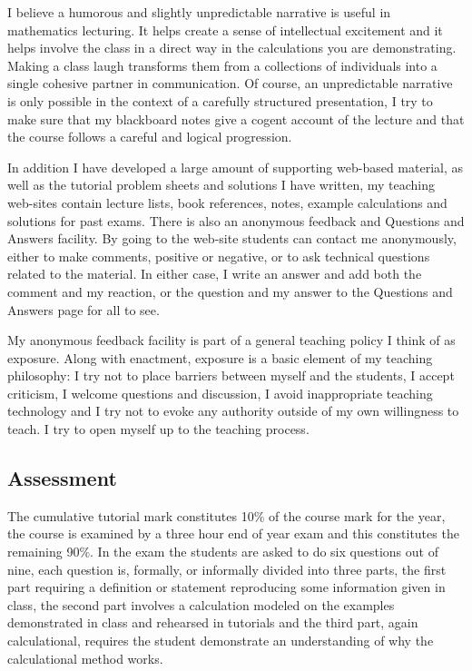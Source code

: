 \documentclass[12pt,a4wide]{article}
\begin{document}
I believe a humorous and slightly unpredictable narrative is useful in
mathematics lecturing. It helps create a sense of intellectual
excitement and it helps involve the class in a direct way in the
calculations you are demonstrating. Making a class laugh transforms
them from a collections of individuals into a single cohesive partner
in communication. Of course, an unpredictable narrative is only
possible in the context of a carefully structured presentation, I try
to make sure that my blackboard notes give a cogent account of the
lecture and that the course follows a careful and logical progression.

In addition I have developed a large amount of supporting web-based
material, as well as the tutorial problem sheets and solutions I have
written, my teaching web-sites contain lecture lists, book references,
notes, example calculations and solutions for past exams.  There is
also an anonymous feedback and Questions and Answers facility. By
going to the web-site students can contact me anonymously, either to
make comments, positive or negative, or to ask technical questions
related to the material. In either case, I write an answer and add
both the comment and my reaction, or the question and my answer to the
Questions and Answers page for all to see.

My anonymous feedback facility is part of a general teaching policy I
think of as exposure.  Along with enactment, exposure is a basic
element of my teaching philosophy: I try not to place barriers between
myself and the students, I accept criticism, I welcome questions and
discussion, I avoid inappropriate teaching technology and I try not to
evoke any authority outside of my own willingness to teach. I try to
open myself up to the teaching process.

\subsection*{Assessment} The cumulative tutorial mark constitutes
10\% of the course mark for the year, the course is examined by a
three hour end of year exam and this constitutes the remaining
90\%. In the exam the students are asked to do six questions out of
nine, each question is, formally, or informally divided into three
parts, the first part requiring a definition or statement reproducing
some information given in class, the second part involves a
calculation modeled on the examples demonstrated in class and
rehearsed in tutorials and the third part, again calculational,
requires the student demonstrate an understanding of why the
calculational method works.
\end{document}
